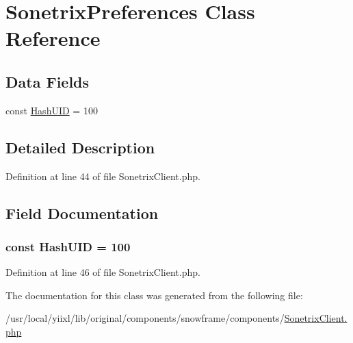 \hypertarget{classSonetrixPreferences}{
\section{SonetrixPreferences Class Reference}
\label{classSonetrixPreferences}
}
\subsection*{Data Fields}
\begin{DoxyCompactItemize}
\item 
const \hyperlink{classSonetrixPreferences_acbc2247c8b484b627ea6fef3d7cbaf7b}{HashUID} = 100
\end{DoxyCompactItemize}


\subsection{Detailed Description}


Definition at line 44 of file SonetrixClient.php.



\subsection{Field Documentation}
\hypertarget{classSonetrixPreferences_acbc2247c8b484b627ea6fef3d7cbaf7b}{
\subsubsection[{HashUID}]{\setlength{\rightskip}{0pt plus 5cm}const {\bf HashUID} = 100}}
\label{classSonetrixPreferences_acbc2247c8b484b627ea6fef3d7cbaf7b}


Definition at line 46 of file SonetrixClient.php.



The documentation for this class was generated from the following file:\begin{DoxyCompactItemize}
\item 
/usr/local/yiixl/lib/original/components/snowframe/components/\hyperlink{SonetrixClient_8php}{SonetrixClient.php}\end{DoxyCompactItemize}
